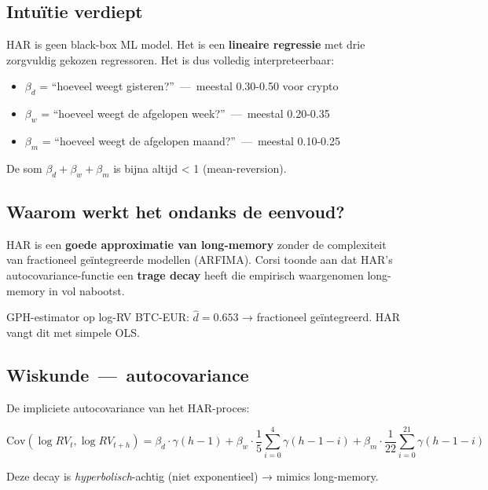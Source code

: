 \hypertarget{intuuxeftie-verdiept}{%
\subsection{Intuïtie verdiept}\label{intuuxeftie-verdiept}}

HAR is geen black-box ML model. Het is een \textbf{lineaire regressie} met drie zorgvuldig gekozen regressoren. Het is dus volledig interpreteerbaar:

\begin{itemize}
\tightlist
\item
  \(\beta_d\) = ``hoeveel weegt gisteren?'' \,---\, meestal 0.30-0.50 voor crypto
\item
  \(\beta_w\) = ``hoeveel weegt de afgelopen week?'' \,---\, meestal 0.20-0.35
\item
  \(\beta_m\) = ``hoeveel weegt de afgelopen maand?'' \,---\, meestal 0.10-0.25
\end{itemize}

De som \(\beta_d + \beta_w + \beta_m\) is bijna altijd \textless{} 1 (mean-reversion).

\hypertarget{waarom-werkt-het-ondanks-de-eenvoud}{%
\subsection{Waarom werkt het ondanks de eenvoud?}\label{waarom-werkt-het-ondanks-de-eenvoud}}

HAR is een \textbf{goede approximatie van long-memory} zonder de complexiteit van fractioneel geïntegreerde modellen (ARFIMA). Corsi toonde aan dat HAR's autocovariance-functie een \textbf{trage decay} heeft die empirisch waargenomen long-memory in vol nabootst.

GPH-estimator op log-RV BTC-EUR: \(\hat{d} = 0.653\) → fractioneel geïntegreerd. HAR vangt dit met simpele OLS.

\hypertarget{wiskunde-autocovariance}{%
\subsection{Wiskunde \,---\, autocovariance}\label{wiskunde-autocovariance}}

De impliciete autocovariance van het HAR-proces:

\[\text{Cov}(\log RV_t, \log RV_{t+h}) = \beta_d \cdot \gamma(h-1) + \beta_w \cdot \frac{1}{5}\sum_{i=0}^{4}\gamma(h-1-i) + \beta_m \cdot \frac{1}{22}\sum_{i=0}^{21}\gamma(h-1-i)\]

Deze decay is \emph{hyperbolisch}-achtig (niet exponentieel) → mimics long-memory.

